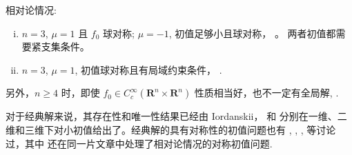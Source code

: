 相对论情况:
\begin{enumerate}[(i)]
    \item $n=3$, $\mu=1$ 且 $f_0$ 球对称; $\mu=-1$, 初值足够小且球对称， \cite*{glassey_symmetric_1985}。 两者初值都需要紧支集条件。
    \item $n=3$, $\mu=1$, 初值球对称且有局域约束条件， \cite*{wang2020global}. 
\end{enumerate}




另外，$n \geqslant 4 $ 时，即使 $f_0 \in C_{c}^{\infty} \left(\mathbf{R}^{n} \times \mathbf{R}^{n}\right)$ 性质相当好，也不一定有全局解, \cite*{HorstClasssicalII}.



对于经典解来说，其存在性和唯一性结果已经由 Iordanskii， \cite*{ukai1978classical} 和 \cite*{bardos1985global} 分别在一维、二维和三维下对小初值给出了。经典解的具有对称性的初值问题也有 \cite*{batt1977global}, \cite*{wollman-1980-symmetric}, \cite*{HorstClasssicalI}, \cite*{schaeffer1987global} 等讨论过，其中 \cite*{schaeffer1987global} 还在同一片文章中处理了相对论情况的对称初值问题.


